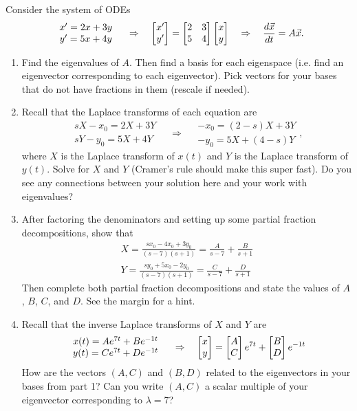 \begin{problem}
 Consider the system of ODEs
$$
\begin{array}{c}
 x' = 2x+3y\\
 y' = 5x+4y
\end{array}
\quad\Rightarrow\quad
\begin{bmatrix} x'\\y' \end{bmatrix} =\begin{bmatrix} 2&3\\5&4 \end{bmatrix}\begin{bmatrix} x\\y \end{bmatrix} 
\quad\Rightarrow\quad
\dfrac{d\vec{x}}{dt} =A\vec x. 
$$
\begin{enumerate}
 \item Find the eigenvalues of $A$. Then find a basis for each eigenspace (i.e. find an eigenvector corresponding to each eigenvector). Pick vectors for your bases that do not have fractions in them (rescale if needed).
 \item Recall that the Laplace transforms of each equation are
$$
\begin{array}{c}
 sX-x_0 = 2X+3Y\\
 sY-y_0 = 5X+4Y
\end{array}
\quad\Rightarrow\quad
\begin{array}{c}
 -x_0 = (2-s)X+3Y\\
 -y_0 = 5X+(4-s)Y
\end{array},
$$
where $X$ is the Laplace transform of $x(t)$ and $Y$ is the Laplace transform of $y(t)$. 
Solve for $X$ and $Y$ (Cramer's rule should make this super fast). Do you see any connections between your solution here and your work with eigenvalues?
\item 
{}%
After factoring the denominators and setting up some partial fraction decompositions, show that 
\begin{align*}
X=\frac{sx_0-4x_0+3y_0}{(s-7)(s+1)}  = \frac{A}{s-7}+\frac{B}{s+1}\\
Y=\frac{sy_0+5x_0-2y_0}{(s-7)(s+1)}  = \frac{C}{s-7}+\frac{D}{s+1}
\end{align*}
Then complete both partial fraction decompositions and state the values of $A$, $B$, $C$, and $D$. See the margin for a hint. 
\item Recall that the inverse Laplace transforms of $X$ and $Y$ are
$$
\begin{array}{c}
x(t)=Ae^{7t}+Be^{-1t}\\
y(t)=Ce^{7t}+De^{-1t}
\end{array}
\quad\Rightarrow\quad
\begin{bmatrix} x\\y \end{bmatrix}=\begin{bmatrix} A\\C \end{bmatrix}e^{7t} + \begin{bmatrix} B\\D \end{bmatrix}e^{-1t}
$$
How are the vectors $(A,C)$ and $(B,D)$ related to the eigenvectors in your bases from part 1? Can you write $(A,C)$ a scalar multiple of your eigenvector corresponding to $\lambda =7$?
\end{enumerate}

\end{problem}

